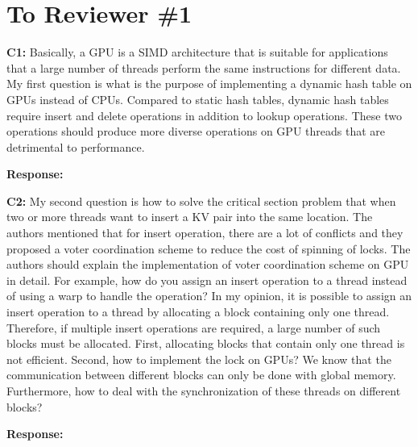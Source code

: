 \section*{To Reviewer \#1}

\begin{shaded}
	\noindent\textbf{C1:} Basically, a GPU is a SIMD architecture that is suitable for applications that a large number of threads perform the same instructions for different data. My first question is what is the purpose of implementing a dynamic hash table on GPUs instead of CPUs. Compared to static hash tables, dynamic hash tables require insert and delete operations in addition to lookup operations. These two operations should produce more diverse operations on GPU threads that are detrimental to performance.
\end{shaded}
%
\noindent\textbf{Response:} 

\begin{shaded}
	\noindent\textbf{C2:} My second question is how to solve the critical section problem that when two or more threads want to insert a KV pair into the same location. The authors mentioned that for insert operation, there are a lot of conflicts and they proposed a voter coordination scheme to reduce the cost of spinning of locks. The authors should explain the implementation of voter coordination scheme on GPU in detail. For example, how do you assign an insert operation to a thread instead of using a warp to handle the operation? In my opinion, it is possible to assign an insert operation to a thread by allocating a block containing only one thread. Therefore, if multiple insert operations are required, a large number of such blocks must be allocated. First, allocating blocks that contain only one thread is not efficient. Second, how to implement the lock on GPUs? We know that the communication between different blocks can only be done with global memory. Furthermore, how to deal with the synchronization of these threads on different blocks? 
\end{shaded}

\noindent\textbf{Response:} 

